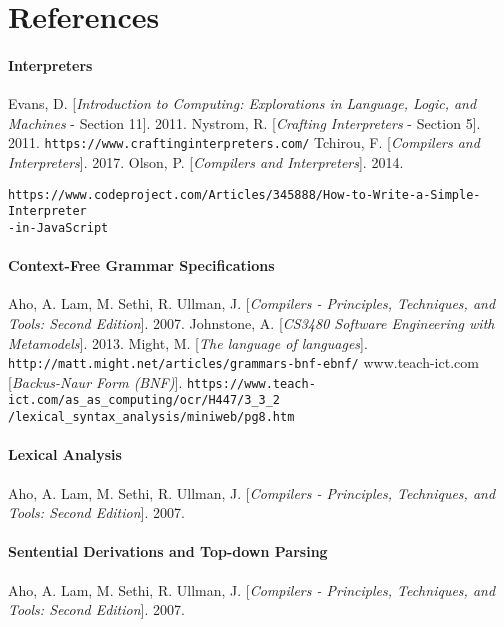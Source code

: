 \documentclass[a4paper, 11pt]{article}
\begin{document}
\part{References}
\begin{thebibliography}{9}
\subsection{Interpreters}
Evans, D.
[\textit{Introduction to Computing: Explorations in Language, Logic, and Machines} - Section 11]. 
2011.
Nystrom, R.
[\textit{Crafting Interpreters} - Section 5]. 
2011.
\texttt{https://www.craftinginterpreters.com/}
Tchirou, F.
[\textit{Compilers and Interpreters}]. 
2017.
Olson, P.
[\textit{Compilers and Interpreters}]. 
2014.
\begin{sloppypar}
\texttt{https://www.codeproject.com/Articles/345888/How-to-Write-a-Simple-Interpreter\\-in-JavaScript}
\end{sloppypar}


\subsection{Context-Free Grammar Specifications}
Aho, A. Lam, M. Sethi, R. Ullman, J.
[\textit{Compilers - Principles, Techniques, and Tools: Second Edition}]. 
2007.
Johnstone, A.
[\textit{CS3480 Software Engineering with Metamodels}]. 
2013.
Might, M.
[\textit{The language of languages}]. 
\texttt{http://matt.might.net/articles/grammars-bnf-ebnf/}
www.teach-ict.com
[\textit{Backus-Naur Form (BNF)}]. 
\texttt{https://www.teach-ict.com/as\_as\_computing/ocr/H447/3\_3\_2
/lexical\_syntax\_analysis/miniweb/pg8.htm}

\subsection{Lexical Analysis}
Aho, A. Lam, M. Sethi, R. Ullman, J.
[\textit{Compilers - Principles, Techniques, and Tools: Second Edition}]. 
2007.

\subsection{Sentential Derivations and Top-down Parsing}
Aho, A. Lam, M. Sethi, R. Ullman, J.
[\textit{Compilers - Principles, Techniques, and Tools: Second Edition}]. 
2007.

\end{thebibliography}
\end{document}
